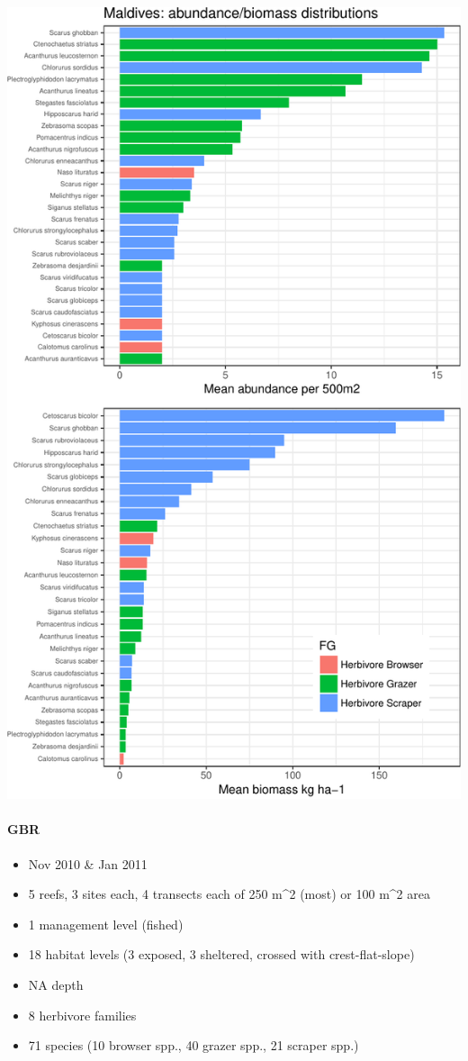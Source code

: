 \documentclass[]{article}
\providecommand{\tightlist}{%
  \setlength{\itemsep}{0pt}\setlength{\parskip}{0pt}}
\let\oldparagraph\paragraph
\renewcommand{\paragraph}[1]{\oldparagraph{#1}\mbox{}}
\begin{document}
\includegraphics{UVC-datasets-explore_files/figure-latex/unnamed-chunk-7-1.pdf}

\paragraph{GBR}\label{gbr}

\begin{itemize}
\tightlist
\item
  Nov 2010 \& Jan 2011
\item
  5 reefs, 3 sites each, 4 transects each of 250 m\^{}2 (most) or 100
  m\^{}2 area
\item
  1 management level (fished)
\item
  18 habitat levels (3 exposed, 3 sheltered, crossed with
  crest-flat-slope)
\item
  NA depth
\item
  8 herbivore families
\item
  71 species (10 browser spp., 40 grazer spp., 21 scraper spp.)
\end{itemize}
\end{document}
